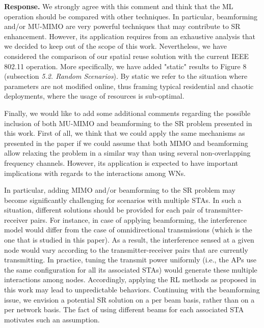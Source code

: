\documentclass[a4paper,twoside,11pt]{reviewresponse}
\begin{document}
\textbf{Response.} We strongly agree with this comment and think that the ML operation should be compared with other techniques. In particular, beamforming and/or MU-MIMO are very powerful techniques that may contribute to SR enhancement. However, its application requires from an exhaustive analysis that we decided to keep out of the scope of this work. %
Nevertheless, we have considered the comparison of our spatial reuse solution with the current IEEE 802.11 operation. More specifically, we have added "static" results to Figure 8 (subsection \textit{5.2. Random Scenarios}). By static we refer to the situation where parameters are not modified online, thus framing typical residential and chaotic deployments, where the usage of resources is sub-optimal.

Finally, we would like to add some additional comments regarding the possible inclusion of both MU-MIMO and beamforming to the SR problem presented in this work. First of all, we think that we could apply the same mechanisms as presented in the paper if we could assume that both MIMO and beamforming allow relaxing the problem in a similar way than using several non-overlapping frequency channels. However, its application is expected to have important implications with regards to the interactions among WNs.

In particular, adding MIMO and/or beamforming to the SR problem may become significantly challenging for scenarios with multiple STAs. In such a situation, different solutions should be provided for each pair of transmitter-receiver pairs. For instance, in case of applying beamforming, the interference model would differ from the case of omnidirectional transmissions (which is the one that is studied in this paper). As a result, the interference sensed at a given node would vary according to the transmitter-receiver pairs that are currently transmitting. In practice, tuning the transmit power uniformly (i.e., the APs use the same configuration for all its associated STAs) would generate these multiple interactions among nodes. Accordingly, applying the RL methods as proposed in this work may lead to unpredictable behaviors. Continuing with the beamforming issue, we envision a potential SR solution on a per beam basis, rather than on a per network basis. The fact of using different beams for each associated STA motivates such an assumption.
\end{document}
